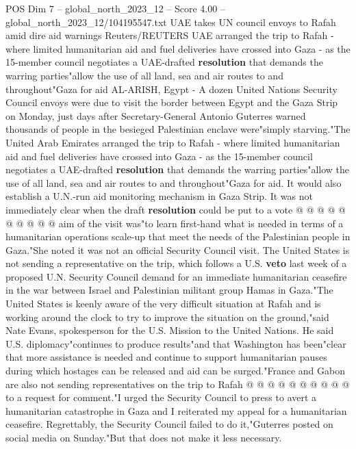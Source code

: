 \begin{textsample}{POS Dim 7 – global\_north\_2023\_12 – Score 4.00 – global\_north\_2023\_12/104195547.txt}  \label{ex:f7_pos_300}
UAE takes UN council envoys to Rafah amid dire aid warnings Reuters/REUTERS UAE arranged the trip to Rafah - where limited humanitarian aid and fuel deliveries have crossed into Gaza - as the 15-member council negotiates a UAE-drafted \textbf{resolution} that demands the warring parties"allow the use of all land, sea and air routes to and throughout"Gaza for aid AL-ARISH, Egypt - A dozen United Nations Security Council envoys were due to visit the border between Egypt and the Gaza Strip on Monday, just days after Secretary-General Antonio Guterres warned thousands of people in the besieged Palestinian enclave were"simply starving."The United Arab Emirates arranged the trip to Rafah - where limited humanitarian aid and fuel deliveries have crossed into Gaza - as the 15-member council negotiates a UAE-drafted \textbf{resolution} that demands the warring parties"allow the use of all land, sea and air routes to and throughout"Gaza for aid.
It would also establish a U.N.-run aid monitoring mechanism in Gaza Strip.
It was not immediately clear when the draft \textbf{resolution} could be put to a vote @ @ @ @ @ @ @ @ @ @ aim of the visit was"to learn first-hand what is needed in terms of a humanitarian operations scale-up that meet the needs of the Palestinian people in Gaza."She noted it was not an official Security Council visit.
The United States is not sending a representative on the trip, which follows a U.S. \textbf{veto} last week of a proposed U.N.
Security Council demand for an immediate humanitarian ceasefire in the war between Israel and Palestinian militant group Hamas in Gaza."The United States is keenly aware of the very difficult situation at Rafah and is working around the clock to try to improve the situation on the ground,"said Nate Evans, spokesperson for the U.S.
Mission to the United Nations.
He said U.S. diplomacy"continues to produce results"and that Washington has been"clear that more assistance is needed and continue to support humanitarian pauses during which hostages can be released and aid can be surged."France and Gabon are also not sending representatives on the trip to Rafah @ @ @ @ @ @ @ @ @ @ to a request for comment."I urged the Security Council to press to avert a humanitarian catastrophe in Gaza and I reiterated my appeal for a humanitarian ceasefire.
Regrettably, the Security Council failed to do it,"Guterres posted on social media on Sunday."But that does not make it less necessary.

\end{textsample}
